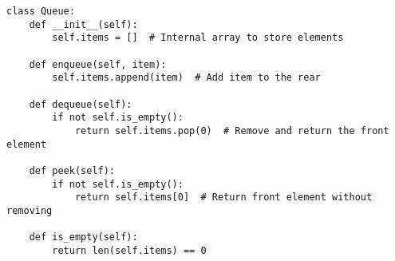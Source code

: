 \begin{algo}
\begin{lstlisting}
class Queue:
    def __init__(self):
        self.items = []  # Internal array to store elements

    def enqueue(self, item):
        self.items.append(item)  # Add item to the rear

    def dequeue(self):
        if not self.is_empty():
            return self.items.pop(0)  # Remove and return the front element

    def peek(self):
        if not self.is_empty():
            return self.items[0]  # Return front element without removing

    def is_empty(self):
        return len(self.items) == 0
\end{lstlisting}
\end{algo}
